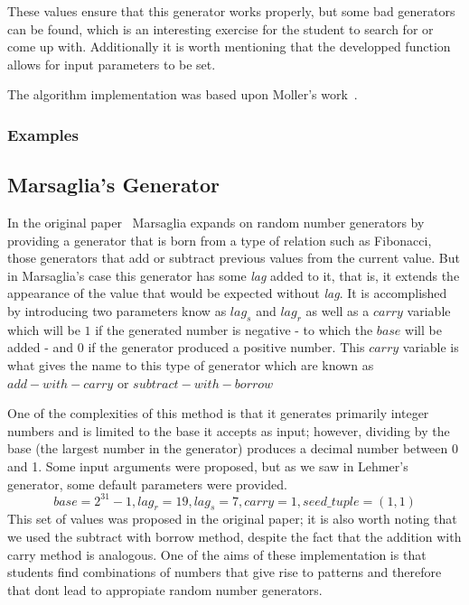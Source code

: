 These values ensure that this generator works properly, but some bad generators can be found, which is an interesting exercise for the student to search for or come up with. Additionally it is worth mentioning that the developped function allows for input parameters to be set.

The algorithm implementation was based upon Moller's work~\cite{doi:10.1137/1.9780898717952}.
\subsubsection{Examples}
	


\subsection{Marsaglia's Generator}

In the original paper~\cite{10.1214/aoap/1177005878} Marsaglia expands on random number generators by providing a generator that is born from a type of relation such as Fibonacci, those generators that add or subtract previous values from the current value. But in Marsaglia's case this generator has some \textit{lag} added to it, that is, it extends the appearance of the value that would be expected without \textit{lag}. It is accomplished by introducing two parameters know as $lag_s$ and $lag_r$ as well as a $carry$ variable which will be $1$ if the generated number is negative - to which the $base$ will be added - and $0$ if the generator produced a positive number. This $carry$ variable is what gives the name to this type of generator which are known as $add-with-carry$ or $subtract-with-borrow$

One of the complexities of this method is that it generates primarily integer numbers and is limited to the base it accepts as input; however, dividing by the base (the largest number in the generator) produces a decimal number between 0 and 1. Some input arguments were proposed, but as we saw in Lehmer's generator, some default parameters were provided. 
\[base = 2^{31}-1, lag_r=19, lag_s=7, carry=1, seed\_tuple = (1,1)\]
This set of values was proposed in the original paper; it is also worth noting that we used the subtract with borrow method, despite the fact that the addition with carry method is analogous. One of the aims of these implementation is that students find combinations of numbers that give rise to patterns and therefore that dont lead to appropiate random number generators.

